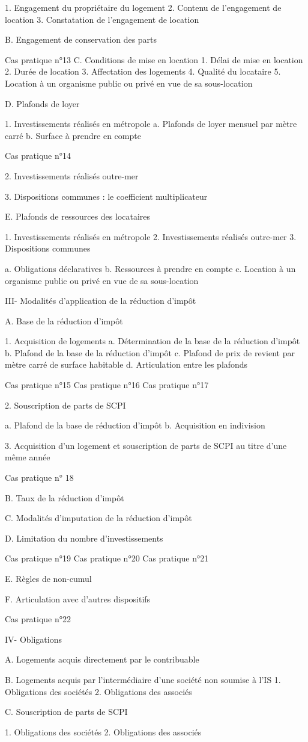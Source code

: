 1. Engagement du propriétaire du logement
2. Contenu de l'engagement de location
3. Constatation de l'engagement de location

B. Engagement de conservation des parts

Cas pratique n°13
C. Conditions de mise en location
1. Délai de mise en location
2. Durée de location
3. Affectation des logements
4. Qualité du locataire
5. Location à un organisme public ou privé en vue de sa sous-location

D. Plafonds de loyer

1. Investissements réalisés en métropole
a. Plafonds de loyer mensuel par mètre carré
b. Surface à prendre en compte

Cas pratique n°14

2. Investissements réalisés outre-mer

3. Dispositions communes : le coefficient multiplicateur


E. Plafonds de ressources des locataires

1. Investissements réalisés en métropole
2. Investissements réalisés outre-mer
3. Dispositions communes

a. Obligations déclaratives
b. Ressources à prendre en compte
c. Location à un organisme public ou privé en vue de sa sous-location

III- Modalités d’application de la réduction d’impôt

A. Base de la réduction d'impôt

1. Acquisition de logements
a. Détermination de la base de la réduction d'impôt
b. Plafond de la base de la réduction d'impôt
c. Plafond de prix de revient par mètre carré de surface habitable
d. Articulation entre les plafonds 

Cas pratique n°15
Cas pratique n°16
Cas pratique n°17 

2. Souscription de parts de SCPI

a. Plafond de la base de réduction d'impôt
b. Acquisition en indivision

3. Acquisition d'un logement et souscription de parts de SCPI au titre d'une même année

Cas pratique n° 18 

B. Taux de la réduction d'impôt

C. Modalités d'imputation de la réduction d'impôt

D. Limitation du nombre d'investissements


Cas pratique n°19 
Cas pratique n°20
Cas pratique n°21 

E. Règles de non-cumul

F. Articulation avec d'autres dispositifs

Cas pratique n°22 

IV- Obligations

A. Logements acquis directement par le contribuable

B. Logements acquis par l'intermédiaire d'une société non soumise à l'IS
1. Obligations des sociétés
2. Obligations des associés

C. Souscription de parts de SCPI

1. Obligations des sociétés
2. Obligations des associés
